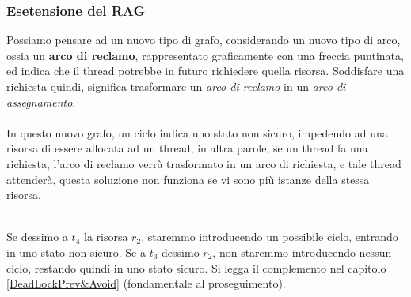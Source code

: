 \documentclass[12pt, letterpaper]{article}
\newcommand{\acc}{\\\hphantom{}\\}
\begin{document}
\subsubsection{Esetensione del RAG}
Possiamo pensare ad un nuovo tipo di grafo, considerando un nuovo tipo di arco, ossia un \textbf{arco di reclamo}, rappresentato graficamente con una freccia puntinata, ed indica che il 
thread potrebbe in futuro richiedere quella risorsa. Soddisfare una richiesta quindi, significa 
trasformare un \textit{arco di reclamo} in un \textit{arco di assegnamento}. \acc In questo nuovo 
grafo, un ciclo indica uno stato non sicuro, impedendo ad una risorsa di essere allocata ad un thread, in altra parole, 
se un thread fa una richiesta, l'arco di reclamo verrà trasformato in un arco di richiesta, e tale thread 
attenderà, questa soluzione non funziona se vi sono più istanze della stessa risorsa.\begin{figure}[h]
\end{figure}
\\ Se dessimo a \(t_4\) la risorsa \(r_2\), staremmo introducendo un possibile ciclo, entrando in uno 
stato non sicuro. Se a \(t_3\) dessimo \(r_2\), non staremmo introducendo nessun ciclo, restando quindi 
in uno stato sicuro. Si legga il complemento nel capitolo \ref{DeadLockPrev&Avoid} (fondamentale al proseguimento).
\end{document}
